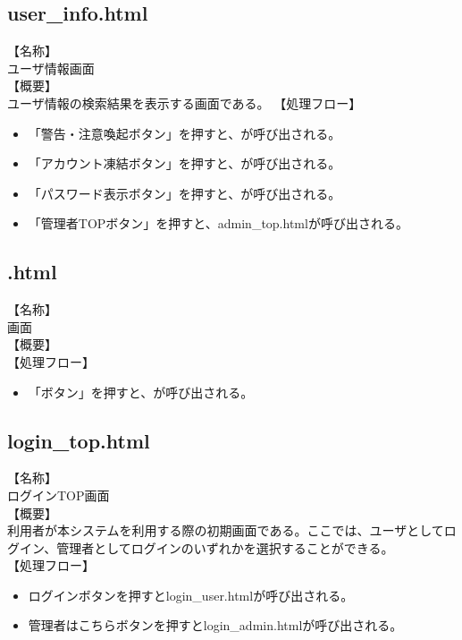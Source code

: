 \documentclass[a4j]{jarticle}
\begin{document}
\subsection{user\_info.html}
\noindent
【名称】\\
ユーザ情報画面\\
【概要】\\
ユーザ情報の検索結果を表示する画面である。
【処理フロー】
\begin{itemize}
\item 「警告・注意喚起ボタン」を押すと、が呼び出される。
\item 「アカウント凍結ボタン」を押すと、が呼び出される。
\item 「パスワード表示ボタン」を押すと、が呼び出される。
\item 「管理者TOPボタン」を押すと、admin\_top.htmlが呼び出される。
\end{itemize}

\subsection{.html}
\noindent
【名称】\\
画面\\
【概要】\\
【処理フロー】
\begin{itemize}
\item 「ボタン」を押すと、が呼び出される。
\end{itemize}

\subsection{login\_top.html}
【名称】\\
ログインTOP画面\\
【概要】\\
利用者が本システムを利用する際の初期画面である。ここでは、ユーザとしてログイン、管理者としてログインのいずれかを選択することができる。\\
【処理フロー】
\begin{itemize}
  \item ログインボタンを押すとlogin\_user.htmlが呼び出される。
  \item 管理者はこちらボタンを押すとlogin\_admin.htmlが呼び出される。
\end{itemize}

\end{document}
